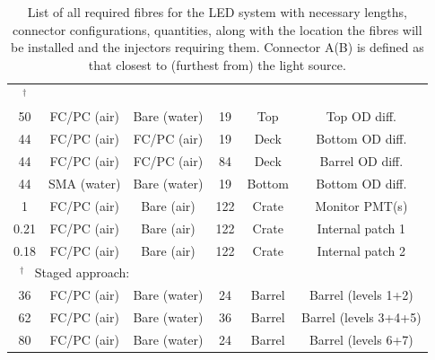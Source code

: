 \documentclass[a4paper,11pt]{article}
\providecommand{\DIFaddendFL}{} %
\DeclareRobustCommand{\DIFaddendFL}{\DIFOaddendFL \let\includegraphics\DIFOincludegraphics} %
\begin{document}
\begin{table}[h]
{\begin{tabular}{cccccc}
{$^\dagger$
}%
\\
50			&	FC/PC (air)	&	Bare (water)	&	19				&	Top				& Top OD diff. \\
44			&	FC/PC (air)	&	FC/PC (air)		&	19				&	Deck			& Bottom OD diff. \\
44			&	FC/PC (air)	&	FC/PC (air)		&	84				&	Deck			& Barrel OD diff. \\
44			&	SMA (water)	&	Bare (water)	&	19				&	Bottom			& Bottom OD diff.	\\
1			&	FC/PC (air)	&	Bare (air)		&	122				&	Crate			& Monitor PMT(s)	\\
0.21		&	FC/PC (air)	&	Bare (air)		&	122				&	Crate 			& Internal patch 1	\\
0.18		&	FC/PC (air)	&	Bare (air)		&	122				&	Crate			& Internal patch 2 \\ \midrule
\multicolumn{3}{l}{\mbox{%
$^\dagger$
}%
Staged approach:}			&					&			\\
36			&	FC/PC (air)	&	Bare (water)	&	24				&	Barrel &	Barrel (levels 1+2) \\
62			&	FC/PC (air)	&	Bare (water)	&	36				&	Barrel &	Barrel (levels 3+4+5)	\\
80			&	FC/PC (air)	&	Bare (water)	&	24				&	Barrel &	Barrel (levels 6+7)	\\
\bottomrule
\end{tabular}
}
\DIFaddendFL \caption{List of all required fibres for the LED system with necessary lengths, connector configurations, quantities, along with the location the fibres will be installed and the injectors requiring them. Connector A(B) is defined as that closest to (furthest from) the light source.}\label{tab:fibreDetailsLED}
\end{table}
\end{document}
